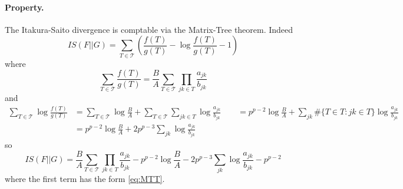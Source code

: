 \documentclass[a4paper, 10pt]{article}
\newcommand{\Tcal}{\mathcal{T}}
\begin{document}
\paragraph{Property.}  The Itakura-Saito divergence is comptable via the Matrix-Tree theorem. Indeed
$$
IS(F || G) 
= \sum_{T \in \Tcal} \left( \frac{f(T)}{g(T)} - \log \frac{f(T)}{g(T)} - 1 \right)
$$
where
$$
\sum_{T \in \Tcal} \frac{f(T)}{g(T)}
= \frac{B}{A} \sum_{T \in \Tcal}  \prod_{jk \in T} \frac{a_{jk}}{b_{jk}}
$$
and
\begin{align*}
 \sum_{T \in \Tcal} \log \frac{f(T)}{g(T)} 
 & = \sum_{T \in \Tcal} \log \frac{B}{A} + \sum_{T \in \Tcal} \sum_{jk \in T} \log \frac{a_{jk}}{b_{jk}} 
 \qquad = p^{p-2} \log \frac{B}{A} + \sum_{jk} \#\{T \in T: jk \in T\} \log \frac{a_{jk}}{b_{jk}}  \\
 & = p^{p-2} \log \frac{B}{A} + 2p^{p-3}\sum_{jk} \log \frac{a_{jk}}{b_{jk}} 
\end{align*}
so
$$
IS(F || G) 
= \frac{B}{A} \sum_{T \in \Tcal} \prod_{jk \in T} \frac{a_{jk}}{b_{jk}} 
- p^{p-2} \log \frac{B}{A} - 2p^{p-3}\sum_{jk} \log \frac{a_{jk}}{b_{jk}}
- p^{p-2}
$$
where the first term has the form \eqref{eq:MTT}.





\end{document}
